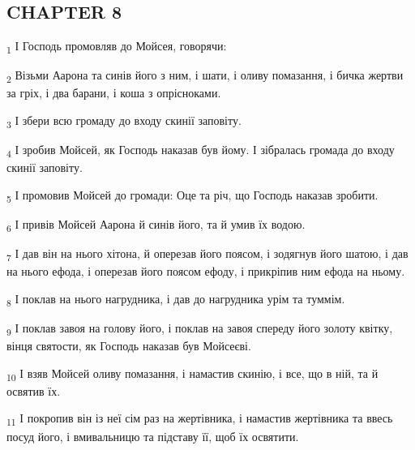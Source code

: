 \subsection{CHAPTER 8}
\begin{tcolorbox}
\textsubscript{1} І Господь промовляв до Мойсея, говорячи:
\end{tcolorbox}
\begin{tcolorbox}
\textsubscript{2} Візьми Аарона та синів його з ним, і шати, і оливу помазання, і бичка жертви за гріх, і два барани, і коша з опрісноками.
\end{tcolorbox}
\begin{tcolorbox}
\textsubscript{3} І збери всю громаду до входу скинії заповіту.
\end{tcolorbox}
\begin{tcolorbox}
\textsubscript{4} І зробив Мойсей, як Господь наказав був йому. І зібралась громада до входу скинії заповіту.
\end{tcolorbox}
\begin{tcolorbox}
\textsubscript{5} І промовив Мойсей до громади: Оце та річ, що Господь наказав зробити.
\end{tcolorbox}
\begin{tcolorbox}
\textsubscript{6} І привів Мойсей Аарона й синів його, та й умив їх водою.
\end{tcolorbox}
\begin{tcolorbox}
\textsubscript{7} І дав він на нього хітона, й оперезав його поясом, і зодягнув його шатою, і дав на нього ефода, і оперезав його поясом ефоду, і прикріпив ним ефода на ньому.
\end{tcolorbox}
\begin{tcolorbox}
\textsubscript{8} І поклав на нього нагрудника, і дав до нагрудника урім та туммім.
\end{tcolorbox}
\begin{tcolorbox}
\textsubscript{9} І поклав завоя на голову його, і поклав на завоя спереду його золоту квітку, вінця святости, як Господь наказав був Мойсеєві.
\end{tcolorbox}
\begin{tcolorbox}
\textsubscript{10} І взяв Мойсей оливу помазання, і намастив скинію, і все, що в ній, та й освятив їх.
\end{tcolorbox}
\begin{tcolorbox}
\textsubscript{11} І покропив він із неї сім раз на жертівника, і намастив жертівника та ввесь посуд його, і вмивальницю та підставу її, щоб їх освятити.
\end{tcolorbox}
